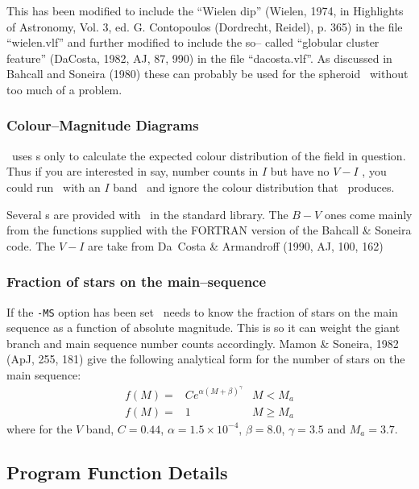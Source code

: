This has been modified to include the ``Wielen dip'' (Wielen, 1974, in
Highlights of Astronomy, Vol. 3, ed. G. Contopoulos (Dordrecht, Reidel), 
p. 365) in the file ``wielen.vlf'' and further modified to include the so--
called ``globular  cluster feature''  (DaCosta, 1982, AJ, 87, 990) in  the
file ``dacosta.vlf''. As discussed in Bahcall and Soneira (1980)  these can
probably be used for the spheroid \lf\ without too much of a problem.

\subsubsection*{Colour--Magnitude Diagrams}

\egm\ uses \cmd s only to calculate the expected colour distribution of the
field in question. Thus if you are interested in say, number counts in $I$
but have no $V-I$ \cmd, you could run \egm\ with an $I$ band \lf\ and ignore 
the colour distribution that \egm\ produces.

Several \cmd s are provided with \egm\ in the standard library. The $B-V$ ones
come mainly from the functions supplied with the FORTRAN version of the
Bahcall \& Soneira code. The $V-I$ are take from Da~Costa \& Armandroff 
(1990, AJ, 100, 162)

\subsubsection*{Fraction of stars on the main--sequence}
If the {\tt -MS} option has been set \egm\ needs to know the fraction of
stars on the main sequence as a function of absolute magnitude. This is
so it can weight the giant branch and main sequence number counts
accordingly. Mamon \& Soneira, 1982 (ApJ, 255, 181) give the following
analytical form for the number of stars on the main sequence:
\[
\begin{array}{lll}
f(M) = & C e^{\alpha(M+\beta)^{\gamma}} & M < M_a \\
f(M) = & 1 & M \geq M_a
\end{array}
\]
where for the $V$ band, $C=0.44$, $\alpha = 1.5\times10^{-4}$, $\beta=8.0$,
$\gamma=3.5$ and $M_a = 3.7$. 

\subsection{Program Function Details}

